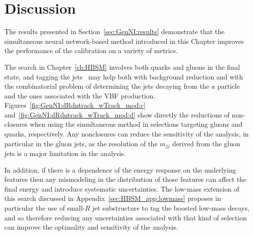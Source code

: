 

\section{Discussion}
\label{sec:GenNI:discussion}
The results presented in Section~\ref{sec:GenNI:results} demonstrate that the simultaneous neural network-based method introduced in this Chapter improves the performance of the calibration on a variety of metrics.

The search in Chapter~\ref{ch:HBSM} involves both quarks and gluons in the final state, and tagging the jets~\cite{ATL-PHYS-PUB-2017-009,Aad:2014gea,ATLAS-CONF-2016-034,ATL-PHYS-PUB-2017-017} may help both with background reduction and with the combinatorial problem of determining the jets decaying from the $a$ particle and the ones associated with the VBF production.
Figures~\ref{fig:GenNI:dRdntrack_wTrack_mod:c} and~\ref{fig:GenNI:dRdntrack_wTrack_mod:d} show directly the reductions of non-closures when using the simultaneous method in selections targeting gluons and quarks, respectively.
Any nonclosures can reduce the sensitivity of the analysis, in particular in the gluon jets, as the resolution of the $m_{jj}$ derived from the gluon jets is a major limitation in the analysis.

In addition, if there is a dependence of the energy response on the underlying features then any mismodeling in the distribution of those features can affect the final energy and introduce systematic uncertainties.
The low-mass extension of this search discussed in Appendix~\ref{sec:HBSM_app:lowmass} proposes in particular the use of small-$R$ jet substructure to tag the boosted low-mass decays, and so therefore reducing any uncertainties associated with that kind of selection can improve the optimality and sensitivity of the analysis.

